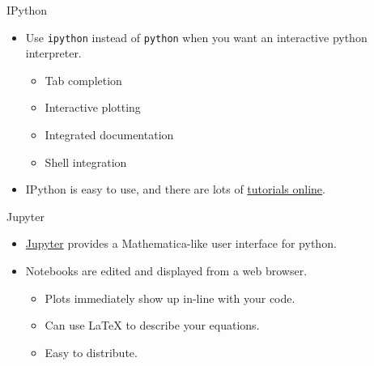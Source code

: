 \begin{frame}{IPython}

 \begin{itemize}

  \item Use \texttt{ipython} instead of \texttt{python} when you want an 
   interactive python interpreter.

  \begin{itemize}
   \item Tab completion
   \item Interactive plotting
   \item Integrated documentation
   \item Shell integration
  \end{itemize}

  \item IPython is easy to use, and there are lots of 
   \href{http://ipython.org/ipython-doc/2/interactive/tutorial.html}{tutorials 
   online}.

 \end{itemize}

\end{frame}

\begin{frame}{Jupyter}


 \begin{itemize}

  \item 
   \href{http://ipython.org/ipython-doc/stable/notebook/index.html}{Jupyter} 
   provides a Mathematica-like user interface for python.

  \item Notebooks are edited and displayed from a web browser.

  \begin{itemize}
   \item Plots immediately show up in-line with your code.
   \item Can use LaTeX to describe your equations.
   \item Easy to distribute.
  \end{itemize}

 \end{itemize}

\end{frame}
